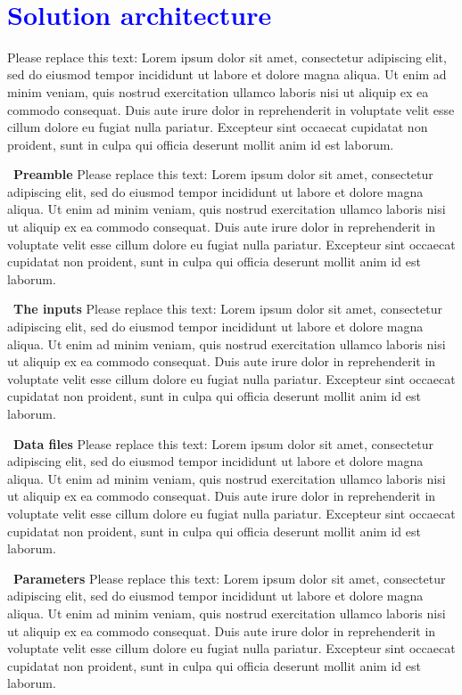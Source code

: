 \documentclass[a4paper, 11pt]{article}
\begin{document}
\ 
\section*{\textcolor{blue}{Solution architecture }}

Please replace this text: Lorem ipsum dolor sit amet, consectetur adipiscing elit, sed do eiusmod tempor incididunt ut labore et dolore magna aliqua. Ut enim ad minim veniam, quis nostrud exercitation ullamco laboris nisi ut aliquip ex ea commodo consequat. Duis aute irure dolor in reprehenderit in voluptate velit esse cillum dolore eu fugiat nulla pariatur. Excepteur sint occaecat cupidatat non proident, sunt in culpa qui officia deserunt mollit anim id est laborum.


\ 
\textbf{Preamble } 
Please replace this text: Lorem ipsum dolor sit amet, consectetur adipiscing elit, sed do eiusmod tempor incididunt ut labore et dolore magna aliqua. Ut enim ad minim veniam, quis nostrud exercitation ullamco laboris nisi ut aliquip ex ea commodo consequat. Duis aute irure dolor in reprehenderit in voluptate velit esse cillum dolore eu fugiat nulla pariatur. Excepteur sint occaecat cupidatat non proident, sunt in culpa qui officia deserunt mollit anim id est laborum.


\ 
\textbf{The inputs } 
Please replace this text: Lorem ipsum dolor sit amet, consectetur adipiscing elit, sed do eiusmod tempor incididunt ut labore et dolore magna aliqua. Ut enim ad minim veniam, quis nostrud exercitation ullamco laboris nisi ut aliquip ex ea commodo consequat. Duis aute irure dolor in reprehenderit in voluptate velit esse cillum dolore eu fugiat nulla pariatur. Excepteur sint occaecat cupidatat non proident, sunt in culpa qui officia deserunt mollit anim id est laborum.


\ 
\textbf{Data files }
Please replace this text: Lorem ipsum dolor sit amet, consectetur adipiscing elit, sed do eiusmod tempor incididunt ut labore et dolore magna aliqua. Ut enim ad minim veniam, quis nostrud exercitation ullamco laboris nisi ut aliquip ex ea commodo consequat. Duis aute irure dolor in reprehenderit in voluptate velit esse cillum dolore eu fugiat nulla pariatur. Excepteur sint occaecat cupidatat non proident, sunt in culpa qui officia deserunt mollit anim id est laborum.


\ 
\textbf{Parameters } 
Please replace this text: Lorem ipsum dolor sit amet, consectetur adipiscing elit, sed do eiusmod tempor incididunt ut labore et dolore magna aliqua. Ut enim ad minim veniam, quis nostrud exercitation ullamco laboris nisi ut aliquip ex ea commodo consequat. Duis aute irure dolor in reprehenderit in voluptate velit esse cillum dolore eu fugiat nulla pariatur. Excepteur sint occaecat cupidatat non proident, sunt in culpa qui officia deserunt mollit anim id est laborum.
\end{document}
